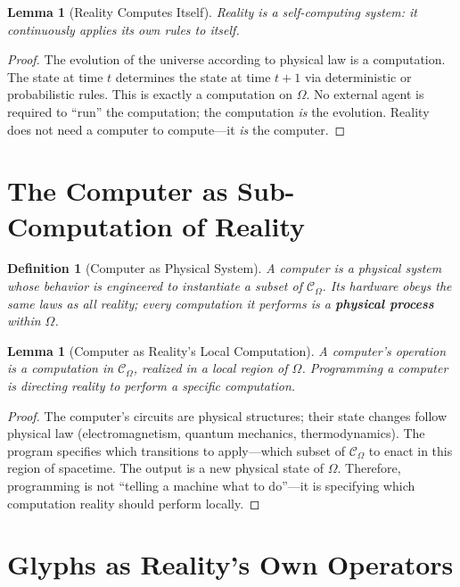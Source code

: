 \documentclass[12pt, letterpaper]{book}
\newtheorem{lemma}[theorem]{Lemma}
\newtheorem{definition}{Definition}[chapter]
\begin{document}
\begin{lemma}[Reality Computes Itself]\label{lem:reality-computes}
Reality is a self-computing system: it continuously applies its own rules to itself.
\end{lemma}

\begin{proof}
The evolution of the universe according to physical law is a computation. The state at time $t$ determines the state at time $t+1$ via deterministic or probabilistic rules. This is exactly a computation on $\Omega$. No external agent is required to ``run'' the computation; the computation \textit{is} the evolution. Reality does not need a computer to compute---it \textit{is} the computer.
\end{proof}

\section{The Computer as Sub-Computation of Reality}

\begin{definition}[Computer as Physical System]\label{def:computer-phys}
A computer is a physical system whose behavior is engineered to instantiate a subset of $\mathcal{C}_\Omega$. Its hardware obeys the same laws as all reality; every computation it performs is a \textbf{physical process} within $\Omega$.
\end{definition}

\begin{lemma}[Computer as Reality's Local Computation]\label{lem:comp-sub}
A computer's operation is a computation in $\mathcal{C}_\Omega$, realized in a local region of $\Omega$. Programming a computer is directing reality to perform a specific computation.
\end{lemma}

\begin{proof}
The computer's circuits are physical structures; their state changes follow physical law (electromagnetism, quantum mechanics, thermodynamics). The program specifies which transitions to apply---which subset of $\mathcal{C}_\Omega$ to enact in this region of spacetime. The output is a new physical state of $\Omega$. Therefore, programming is not ``telling a machine what to do''---it is specifying which computation reality should perform locally.
\end{proof}

\section{Glyphs as Reality's Own Operators}
\end{document}
